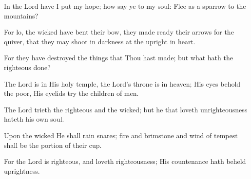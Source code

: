 In the Lord have I put my hope; how say ye to my soul: Flee as a sparrow to the mountains?

For lo, the wicked have bent their bow, they made ready their arrows for the quiver, that they may shoot in darkness at the upright in heart.

For they have destroyed the things that Thou hast made; but what hath the righteous done?

The Lord is in His holy temple, the Lord’s throne is in heaven; His eyes behold the poor, His eyelids try the children of men.

The Lord trieth the righteous and the wicked; but he that loveth unrighteousness hateth his own soul.

Upon the wicked He shall rain snares; fire and brimstone and wind of tempest shall be the portion of their cup.

For the Lord is righteous, and loveth righteousness; His countenance hath beheld uprightness.
